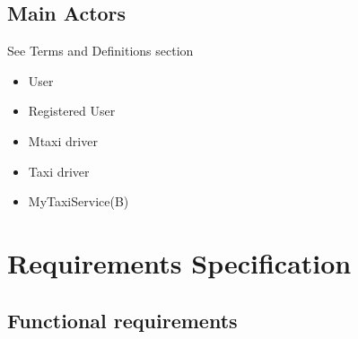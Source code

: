 \documentclass[11pt,titlepage]{article} %
\begin{document}
      \subsection{Main Actors}
	See Terms and Definitions section
	\begin{itemize}
	        \item User
	        \item Registered User
	        \item Mtaxi driver
	        \item Taxi driver
	        \item MyTaxiService(B)
	\end{itemize}

\section{Requirements Specification}
    \subsection{Functional requirements}
\end{document}
